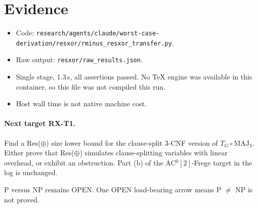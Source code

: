 \documentclass[11pt]{article}
\begin{document}
\section{Evidence}
\begin{itemize}
\item Code: \texttt{research/agents/claude/worst-case-derivation/resxor/rminus\_resxor\_transfer.py}.
\item Raw output: \texttt{resxor/raw\_results.json}.
\item Single stage, 1.3\,s, all assertions passed. No TeX engine was available in this container, so this file was not compiled this run.
\item Host wall time is not native machine cost.
\end{itemize}

\paragraph{Next target RX-T1.} Find a Res($\oplus$) size lower bound for the clause-split 3-CNF version of $T_G\circ\mathrm{MAJ}_3$. Either prove that Res($\oplus$) simulates clause-splitting variables with linear overhead, or exhibit an obstruction. Part (b) of the AC$^0[2]$-Frege target in the log is unchanged.

\medskip\noindent P versus NP remains OPEN. One OPEN load-bearing arrow means P $\ne$ NP is not proved.
\end{document}
